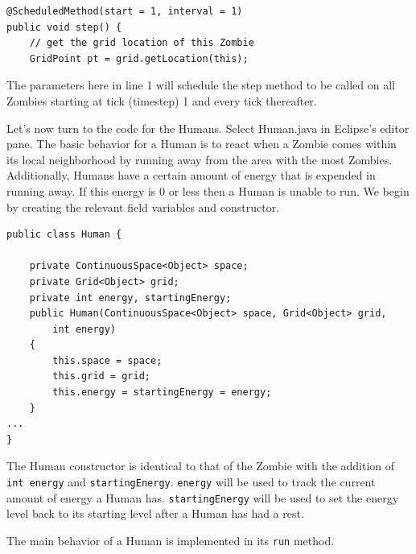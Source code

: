 \documentclass[11pt]{amsart}
\begin{document}
\noindent\begin{minipage}[h]{\textwidth}
\vspace{.2in}
\lstset{language=java,caption=Step Method with Annotation}
\begin{lstlisting}
@ScheduledMethod(start = 1, interval = 1)
public void step() {
	// get the grid location of this Zombie
	GridPoint pt = grid.getLocation(this);
\end{lstlisting}
\vspace{.2in}
\end{minipage}

The parameters here in line 1 will schedule the step method to be called on all Zombies starting at tick (timestep) 1 and every tick thereafter. 

Let's now turn to the code for the Humans. Select Human.java in Eclipse's editor pane. The basic behavior for a Human is to react when a Zombie comes within its local neighborhood by running away from the area with the most Zombies. Additionally, Humans have  a certain amount of energy that is expended in running away. If this energy is 0 or less then a Human is unable to run. We begin by creating the relevant field variables and constructor.

\noindent\begin{minipage}[h]{\textwidth}
\vspace{.2in}
\lstset{language=java,caption=Human Constructor and Variables}
\begin{lstlisting}
public class Human {
	
	private ContinuousSpace<Object> space;
	private Grid<Object> grid;
	private int energy, startingEnergy;
	public Human(ContinuousSpace<Object> space, Grid<Object> grid, 
		int energy) 
	{	
		this.space = space;
		this.grid = grid;
		this.energy = startingEnergy = energy;
	}
...
}
\end{lstlisting}
\vspace{.2in}
\end{minipage}
The Human constructor is identical to that of the Zombie with the addition of \texttt{int energy} and \texttt{startingEnergy}. \texttt{energy} will be used to track the current amount of energy a Human has.  \texttt{startingEnergy} will be used to set the energy level back to its starting level after a Human has had a rest. 

The main behavior of a Human is implemented in its \texttt{run} method.
\end{document}
